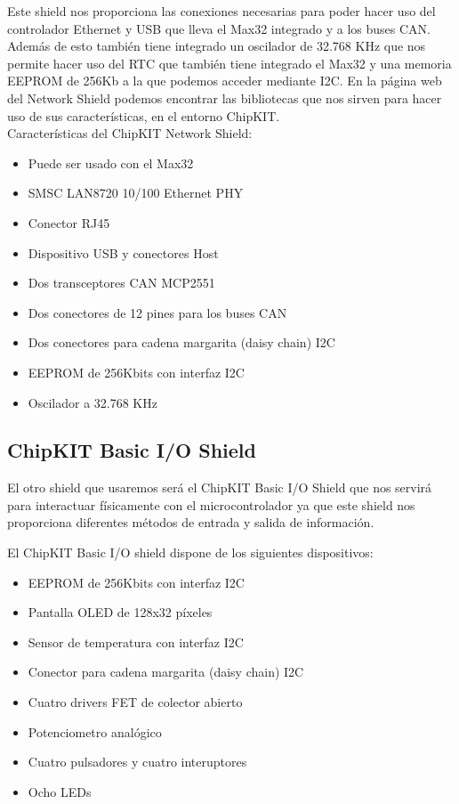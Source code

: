 
Este shield nos proporciona las conexiones necesarias para poder hacer uso del controlador Ethernet y USB que lleva el Max32 integrado y a los buses CAN. Además de esto también tiene integrado un oscilador de 32.768 KHz que nos permite hacer uso del RTC que también tiene integrado el Max32 y una memoria EEPROM de 256Kb a la que podemos acceder mediante I2C. En la página web del Network Shield\cite{website:network_shield} podemos encontrar las bibliotecas que nos sirven para hacer uso de sus características, en el entorno ChipKIT.\\

Características del ChipKIT Network Shield:
\begin{itemize}
	\item Puede ser usado con el Max32
	\item SMSC LAN8720 10/100 Ethernet PHY
	\item Conector RJ45
	\item Dispositivo USB y conectores Host
	\item Dos transceptores CAN MCP2551
	\item Dos conectores de 12 pines para los buses CAN
	\item Dos conectores para cadena margarita (daisy chain) I2C
	\item EEPROM de 256Kbits con interfaz I2C
	\item Oscilador a 32.768 KHz
\end{itemize}

\newpage


\subsection{ChipKIT Basic I/O Shield}
El otro shield que usaremos será el ChipKIT Basic I/O Shield que nos servirá para interactuar físicamente con el microcontrolador ya que este shield nos proporciona diferentes métodos de entrada y salida de información.


El ChipKIT Basic I/O shield dispone de los siguientes dispositivos:
\begin{itemize}
	\item EEPROM de 256Kbits con interfaz I2C
	\item Pantalla OLED de 128x32 píxeles
	\item Sensor de temperatura con interfaz I2C
	\item Conector para cadena margarita (daisy chain) I2C
	\item Cuatro drivers FET de colector abierto
	\item Potenciometro analógico
	\item Cuatro pulsadores y cuatro interuptores
	\item Ocho LEDs
\end{itemize}

